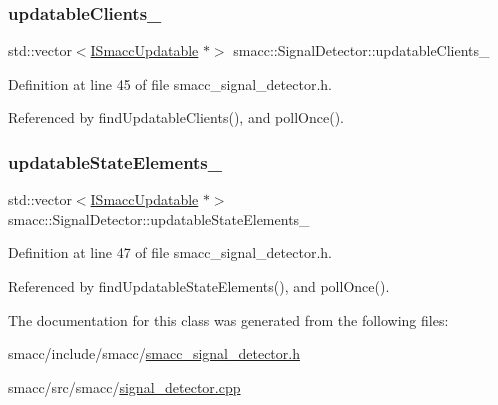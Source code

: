 \subsubsection{\texorpdfstring{updatable\+Clients\+\_\+}{updatableClients\_}}
{\footnotesize\ttfamily std\+::vector$<$\hyperlink{classsmacc_1_1ISmaccUpdatable}{I\+Smacc\+Updatable} $\ast$$>$ smacc\+::\+Signal\+Detector\+::updatable\+Clients\+\_\+\hspace{0.3cm}{\ttfamily [private]}}



Definition at line 45 of file smacc\+\_\+signal\+\_\+detector.\+h.



Referenced by find\+Updatable\+Clients(), and poll\+Once().

\mbox{\label{classsmacc_1_1SignalDetector_a07a5e7bb00c348435d954e22682fa610}} 
\subsubsection{\texorpdfstring{updatable\+State\+Elements\+\_\+}{updatableStateElements\_}}
{\footnotesize\ttfamily std\+::vector$<$\hyperlink{classsmacc_1_1ISmaccUpdatable}{I\+Smacc\+Updatable} $\ast$$>$ smacc\+::\+Signal\+Detector\+::updatable\+State\+Elements\+\_\+\hspace{0.3cm}{\ttfamily [private]}}



Definition at line 47 of file smacc\+\_\+signal\+\_\+detector.\+h.



Referenced by find\+Updatable\+State\+Elements(), and poll\+Once().



The documentation for this class was generated from the following files\+:\begin{DoxyCompactItemize}
\item 
smacc/include/smacc/\hyperlink{smacc__signal__detector_8h}{smacc\+\_\+signal\+\_\+detector.\+h}\item 
smacc/src/smacc/\hyperlink{signal__detector_8cpp}{signal\+\_\+detector.\+cpp}\end{DoxyCompactItemize}

